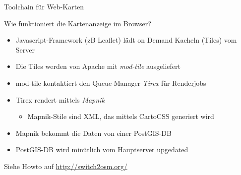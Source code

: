 \documentclass{beamer}
\begin{document}
    

\begin{frame}{Toolchain für Web-Karten}

Wie funktioniert die Kartenanzeige im Browser?
\pause

\begin{itemize}
  \item Javascript-Framework (zB Leaflet) lädt on Demand Kacheln (Tiles) vom Server
  \item Die Tiles werden von  Apache mit \emph{mod-tile} ausgeliefert
  \item mod-tile kontaktiert den Queue-Manager \emph{Tirex} für Renderjobs
  \item Tirex rendert mittels \emph{Mapnik}
  \begin{itemize}
    \item Mapnik-Stile sind XML, das mittels CartoCSS generiert wird
  \end{itemize}
  \item Mapnik bekommt die Daten von einer PostGIS-DB
  \item PostGIS-DB wird minütlich vom Hauptserver upgedated
\end{itemize}

Siehe Howto auf \url{http://switch2osm.org/}

\end{frame}
\end{document}
